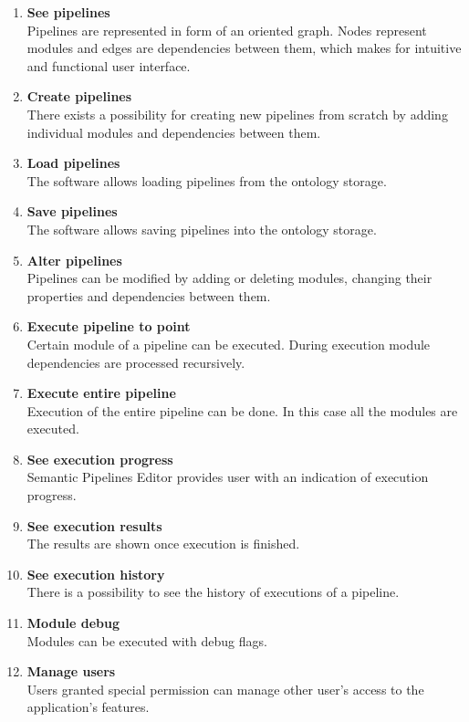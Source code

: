 \documentclass{article}
\begin{document}
\begin{enumerate}[FRQ1]
    \item \textbf{See pipelines}\\
	Pipelines are represented in form of an oriented graph. Nodes represent modules and edges are dependencies between them, which makes for intuitive and functional user interface.
    \item \textbf{Create pipelines}\\
	There exists a possibility for creating new pipelines from scratch by adding individual modules and dependencies between them.
    \item \textbf{Load pipelines}\\
	The software allows loading pipelines from the ontology storage.
    \item \textbf{Save pipelines}\\
	The software allows saving pipelines into the ontology storage.
    \item \textbf{Alter pipelines}\\
	Pipelines can be modified by adding or deleting modules, changing their properties and dependencies between them.
    \item \textbf{Execute pipeline to point}\\
	Certain module of a pipeline can be executed. During execution module dependencies are processed recursively.
    \item \textbf{Execute entire pipeline}\\
	Execution of the entire pipeline can be done. In this case all the modules are executed.
    \item \textbf{See execution progress}\\
	Semantic Pipelines Editor provides user with an indication of execution progress.
    \item \textbf{See execution results}\\
	The results are shown once execution is finished.
    \item \textbf{See execution history}\\
	There is a possibility to see the history of executions of a pipeline.
    \item \textbf{Module debug}\\
	Modules can be executed with debug flags.
    \item \textbf{Manage users}\\
	Users granted special permission can manage other user's access to the application's features.
\end{enumerate}
\end{document}
